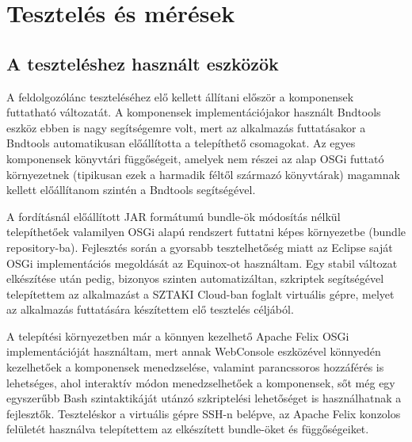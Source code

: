 \chapter{Tesztelés és mérések}
\label{cha:test}

\section{A teszteléshez használt eszközök}
\label{sec:testtools}

A feldolgozólánc teszteléséhez elő kellett állítani először a komponensek futtatható változatát. A komponensek implementációjakor használt Bndtools eszköz ebben is nagy segítségemre volt, mert az alkalmazás futtatásakor a Bndtools automatikusan előállította a telepíthető csomagokat. Az egyes komponensek könyvtári függőségeit, amelyek nem részei az alap OSGi futtató környezetnek (tipikusan ezek a harmadik féltől származó könyvtárak) magamnak kellett előállítanom szintén a Bndtools segítségével.

A fordításnál előállított JAR formátumú bundle-ök módosítás nélkül telepíthetőek valamilyen OSGi alapú rendszert futtatni képes környezetbe (bundle repository-ba). Fejlesztés során a gyorsabb tesztelhetőség miatt az Eclipse saját OSGi implementációs megoldását az Equinox-ot használtam. Egy stabil változat elkészítése után pedig, bizonyos szinten automatizáltan, szkriptek segítségével telepítettem az alkalmazást a SZTAKI Cloud-ban foglalt virtuális gépre, melyet az alkalmazás futtatására készítettem elő tesztelés céljából.

A telepítési környezetben már a könnyen kezelhető Apache Felix \cite{apachefelix} OSGi implementációját használtam, mert annak WebConsole eszközével könnyedén kezelhetőek a komponensek menedzselése, valamint parancssoros hozzáférés is lehetséges, ahol interaktív módon menedzselhetőek a komponensek, sőt még egy egyszerűbb Bash szintaktikáját utánzó szkriptelési lehetőséget is használhatnak a fejlesztők. Teszteléskor a virtuális gépre SSH-n belépve, az Apache Felix konzolos felületét használva telepítettem az elkészített bundle-öket és függőségeiket.

